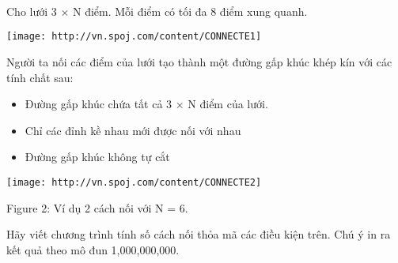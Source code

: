  

 

 

Cho lưới 3 × N điểm. Mỗi điểm có tối đa 8 điểm xung quanh.


\texttt{[image: http://vn.spoj.com/content/CONNECTE1]}

Người ta nối các điểm của lưới tạo thành một đường gấp khúc khép kín với các tính chất sau:
\begin{itemize}
	\item Đường gấp khúc chứa tất cả 3 × N điểm của lưới.
	\item Chỉ các đỉnh kề nhau mới được nối với nhau
	\item Đường gấp khúc không tự cắt
\end{itemize}


\texttt{[image: http://vn.spoj.com/content/CONNECTE2]}

Figure 2: Ví dụ 2 cách nối với N = 6.

Hãy viết chương trình tính số cách nối thỏa mã các điều kiện trên. Chú ý in ra kết quả theo mô đun 1,000,000,000.

\